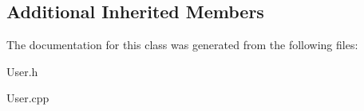 \subsection*{Additional Inherited Members}


The documentation for this class was generated from the following files\+:\begin{DoxyCompactItemize}
\item 
User.\+h\item 
User.\+cpp\end{DoxyCompactItemize}
